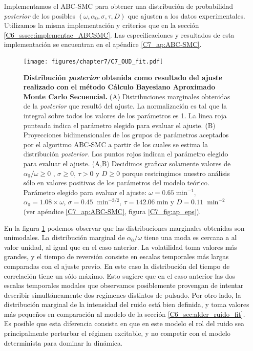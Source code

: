 \documentclass[./main.tex]{subfiles}
\begin{document}
Implementamos el ABC-SMC para obtener una distribución de probabilidad \textit{posterior} de los posibles $(\omega,\alpha_0,\sigma,\tau,D)$ que ajusten a los datos experimentales. Utilizamos la misma implementación y criterios que en la sección \ref{C6_sssec:implementac_ABCSMC}. Las especificaciones y resultados de esta implementación se encuentran en el apéndice \ref{C7_ap:ABC-SMC}.


\begin{figure}
    \centering
    \texttt{[image: figures/chapter7/C7\_OUD\_fit.pdf]} 
    \caption{\textbf{Distribución \textit{posterior} obtenida como resultado del ajuste realizado con el método Cálculo Bayesiano Aproximado Monte Carlo Secuencial.} (A) Distribuciones marginales obtenidas de la \textit{posterior} que resultó del ajuste. La normalización es tal que la integral sobre todos los valores de los parámetros es 1. La linea roja punteada indica el parámetro elegido para evaluar el ajuste. (B) Proyecciones bidimensionales de los grupos de parámetros aceptados por el algoritmo ABC-SMC a partir de los cuales se estima la distribución \textit{posterior}. Los puntos rojos indican el parámetro elegido para evaluar el ajuste. (A,B) Decidimos graficar solamente valores de $\alpha_0 / \omega \geq 0$ , $\sigma  \geq 0$, $\tau  > 0$ y $D  \geq 0$ porque restringimos nuestro análisis sólo en valores positivos de los parámetros del modelo teórico. Parámetro elegido para evaluar el ajuste: $\omega = 0.65 \; \text{min}^{-1}$, $\alpha_0 = 1.08 \times \omega$, $ \sigma = 0.45 \; \; \text{min}^{-3/2}$, $\tau = 142.06 \; \text{min} $ y $D = 0.11 \; \; \text{min}^{-2}$ (ver apéndice \ref{C7_ap:ABC-SMC}, figura \ref{C7_fig:ap_eps}).}
    \label{C7_fig:OUD_fit}
\end{figure} 


En la figura \ref{C7_fig:OUD_fit} podemos observar que las distribuciones marginales obtenidas son unimodales. La distribución marginal de $\alpha_0/\omega$ tiene una moda es cercana a al valor unidad, al igual que en el caso anterior. La volatilidad toma valores más grandes, y el tiempo de reversión consiste en escalas temporales más largas comparadas con el ajuste previo. En este caso la distribución del tiempo de correlación tiene un sólo máximo. Esto sugiere que en el caso anterior las dos escalas temporales modales que observamos posiblemente provengan de intentar describir simultáneamente dos regímenes distintos de pulsado. Por otro lado, la distribución marginal de la intensidad del ruido está bien definida, y toma valores más pequeños en comparación al modelo de la sección \ref{C6_sec:alder_ruido_fit}. Es posible que esta diferencia consista en que en este modelo el rol del ruido sea principalmente perturbar el régimen excitable, y no competir con el modelo determinista para dominar la dinámica. 
\end{document}

